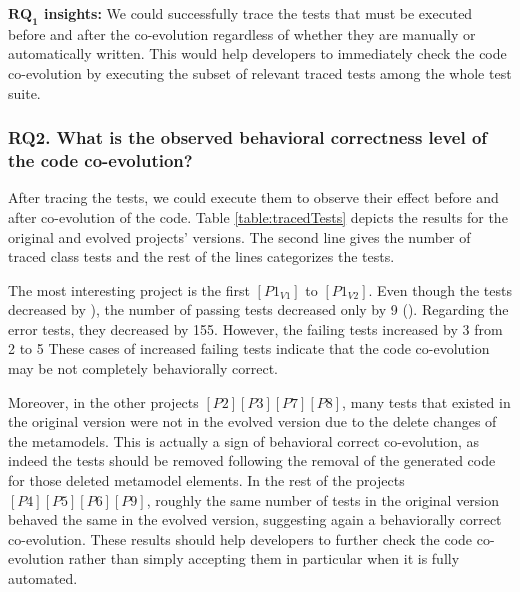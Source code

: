 \begin{tcolorbox}[boxsep=-2pt]
	\textbf{$\boldsymbol{RQ_1}$ insights:}
	We could successfully trace the tests that must be executed before and after the co-evolution regardless of whether they are manually or automatically written. This would help developers to immediately check the code co-evolution by executing the subset of relevant traced tests among the whole test suite. 
\end{tcolorbox}

\subsubsection{RQ2. What is the observed behavioral correctness level of the code co-evolution?}

After tracing the tests, we could execute them to observe their effect before and after co-evolution of the code. Table \ref{table:tracedTests} depicts the results for the original and evolved projects' versions. The second line gives the number of traced class tests and the rest of the lines categorizes the tests.  

The most interesting project is the first $[P1_{V1}]$ to $[P1_{V2}]$. Even though the tests decreased by ), the number of passing tests decreased only by 9 (). Regarding the error tests, they decreased by 155. However, the failing tests increased by 3 from 2 to 5 These cases of increased failing tests indicate that the code co-evolution may be not completely behaviorally correct. 

Moreover, in the other projects $[P2][P3][P7][P8]$, many tests that existed in the original version were not in the evolved version due to the delete changes of the metamodels. This is actually a sign of behavioral correct co-evolution, as indeed the tests should be removed following the removal of the generated code for those deleted metamodel elements. 
\red{}In the rest of the projects $[P4][P5][P6][P9]$, roughly the same number of tests in the original version behaved the same in the evolved version, suggesting again a behaviorally correct co-evolution.
These results should help developers to further check the code co-evolution rather than simply accepting them in particular when it is fully automated. 

